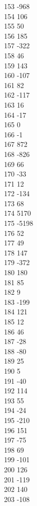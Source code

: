{ 153	-968 \\
 154	106 \\
 155	50 \\
 156	185 \\
 157	-322 \\
 158	46 \\
 159	143 \\
 160	-107 \\
 161	82 \\
 162	-117 \\
 163	16 \\
 164	-17 \\
 165	0 \\
 166	-1 \\
 167	872 \\
 168	-826 \\
 169	66 \\
 170	-33 \\
 171	12 \\
 172	-134 \\
 173	68 \\
 174	5170 \\
 175	-5198 \\
 176	52 \\
 177	49 \\
 178	147 \\
 179	-372 \\
 180	180 \\
 181	85 \\
 182	9 \\
 183	-199 \\
 184	121 \\
 185	12 \\
 186	46 \\
 187	-28 \\
 188	-80 \\
 189	25 \\
 190	5 \\
 191	-40 \\
 192	114 \\
 193	55 \\
 194	-24 \\
 195	-210 \\
 196	151 \\
 197	-75 \\
 198	69 \\
 199	-101 \\
 200	126 \\
 201	-119 \\
 202	140 \\
 203	-108 \\
}
